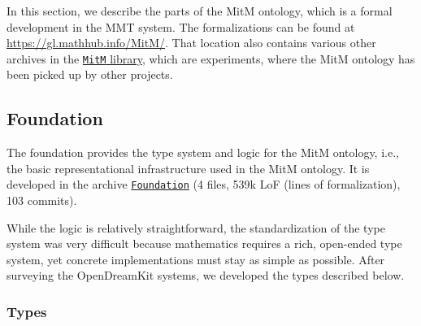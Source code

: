 In this section, we describe the parts of the MitM ontology, which is a formal development in the MMT system.
The formalizations can be found at \url{https://gl.mathhub.info/MitM/}.
That location also contains various other archives in the \href{https://gl.mathhub.info/MitM/}{\texttt{MitM} library}, which are experiments, where the MitM ontology has been picked up by other projects.


\subsection{Foundation}


The foundation provides the type system and logic for the MitM ontology, i.e., the basic representational infrastructure used in the MitM ontology.
It is developed in the archive  \href{https://gl.mathhub.info/MitM/Foundation}{\texttt{Foundation}} (4 files, 539k LoF (lines
of formalization), 103 commits).

While the logic is relatively straightforward, the standardization of
the type system was very difficult because mathematics requires a
rich, open-ended type system, yet concrete implementations must stay as simple as possible.
After surveying the OpenDreamKit systems, we developed the types described below.


\subsubsection{Types}

